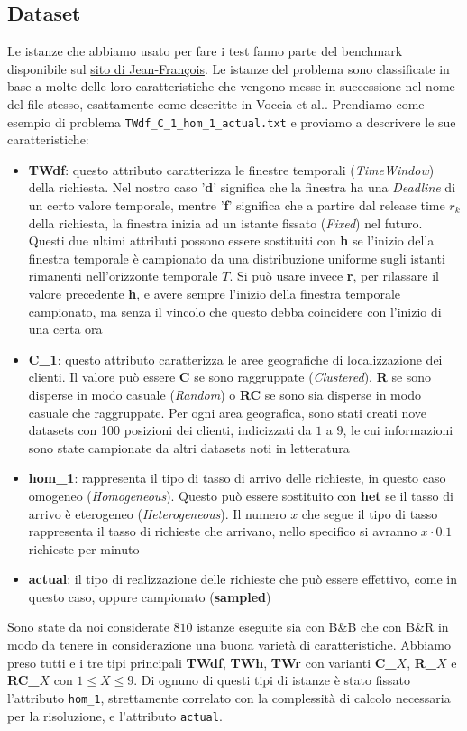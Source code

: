 \documentclass[
    article,            %
    12pt,                %
    oneside,            %
    a4paper,            %
    english,            %
    italian,                %
    sumario=tradicional,
]{abntex2}
\begin{document}
\newpage
\subsection{Dataset}
Le istanze che abbiamo usato per fare i test fanno parte del benchmark disponibile sul \href{https://sites.google.com/view/jfcote/}{sito di Jean-François}. Le istanze del problema sono classificate in base a molte delle loro caratteristiche che vengono messe in successione nel nome del file stesso, esattamente come descritte in Voccia et al.\cite{Voccia}. Prendiamo come esempio di problema \texttt{TWdf\_C\_1\_hom\_1\_actual.txt} e proviamo a descrivere le sue caratteristiche:
\begin{itemize}
    \item \textbf{TWdf}: questo attributo caratterizza le finestre temporali (\textit{TimeWindow}) della richiesta. Nel nostro caso '\textbf{d}' significa che la finestra ha una \textit{Deadline} di un certo valore temporale, mentre '\textbf{f}' significa che a partire dal release time $r_k$ della richiesta, la finestra inizia ad un istante fissato (\textit{Fixed}) nel futuro. Questi due ultimi attributi possono essere sostituiti con \textbf{h} se l'inizio della finestra temporale è campionato da una distribuzione uniforme sugli istanti rimanenti nell'orizzonte temporale $T$. Si può usare invece \textbf{r}, per rilassare il valore precedente \textbf{h}, e avere sempre l'inizio della finestra temporale campionato, ma senza il vincolo che questo debba coincidere con l'inizio di una certa ora
    \item \textbf{C\_1}: questo attributo caratterizza le aree geografiche di localizzazione dei clienti. Il valore può essere \textbf{C} se sono raggruppate (\textit{Clustered}), \textbf{R} se sono disperse in modo casuale (\textit{Random}) o \textbf{RC} se sono sia disperse in modo casuale che raggruppate. Per ogni area geografica, sono stati creati nove datasets con 100 posizioni dei clienti, indicizzati da $1$ a $9$, le cui informazioni sono state campionate da altri datasets noti in letteratura
    \item \textbf{hom\_1}: rappresenta il tipo di tasso di arrivo delle richieste, in questo caso omogeneo (\textit{Homogeneous}). Questo può essere sostituito con \textbf{het} se il tasso di arrivo è eterogeneo (\textit{Heterogeneous}). Il numero $x$ che segue  il tipo di tasso rappresenta il tasso di richieste che arrivano, nello specifico si avranno $x\cdot 0.1$ richieste per minuto
    \item \textbf{actual}: il tipo di realizzazione delle richieste che può essere effettivo, come in questo caso, oppure campionato (\textbf{sampled}) 
\end{itemize}
Sono state da noi considerate $810$ istanze eseguite sia con B\&B che con B\&R in modo da tenere in considerazione una buona varietà di caratteristiche. Abbiamo preso tutti e i tre tipi principali \textbf{TWdf}, \textbf{TWh}, \textbf{TWr} con varianti \textbf{C\_}$X$, \textbf{R\_}$X$ e \textbf{RC\_}$X$ con $1 \leq X \leq 9$. Di ognuno di questi tipi di istanze è stato fissato l'attributo \texttt{hom\_1}, strettamente correlato con la complessità di calcolo necessaria per la risoluzione, e l'attributo \texttt{actual}.
\end{document}
